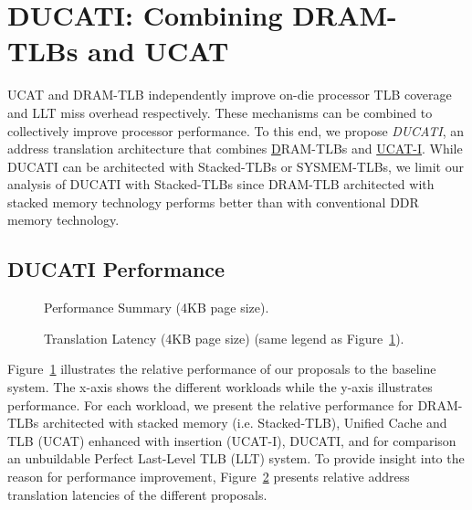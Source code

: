 \section{DUCATI: Combining DRAM-TLBs \newline and UCAT}
\label{sec:DUCATI}

\noindent UCAT and DRAM-TLB independently improve on-die
processor TLB coverage and LLT miss overhead respectively. These
mechanisms can be combined to collectively improve processor
performance. To this end, we propose {\em DUCATI}, an address
translation architecture that combines \underline{D}RAM-TLBs and
\underline{UCAT-I}. While DUCATI can be architected with Stacked-TLBs
or SYSMEM-TLBs, we limit our analysis of DUCATI with Stacked-TLBs
since DRAM-TLB architected with stacked memory technology performs
better than with conventional DDR memory technology.

\subsection{DUCATI Performance}

\begin{figure}[tp] 
\vspace{-0 in} \centering
\centerline{}

\caption{\small Performance Summary (4KB page size).\normalsize}
\label{fig:summary_4k_pages_perf} 
\vspace{0.1 in}
\end{figure}

\begin{figure}[tp] 
\vspace{0.1 in} \centering
\centerline{}

\caption{\small Translation Latency (4KB page size) (same legend as
  Figure~\ref{fig:summary_4k_pages_perf}).\normalsize}
\label{fig:summary_4k_pages_lat} 
\vspace{-0. in}
\end{figure}

\noindent Figure~\ref{fig:summary_4k_pages_perf} illustrates the
relative performance of our proposals to the baseline system. The
x-axis shows the different workloads while the y-axis illustrates
performance. For each workload, we present the relative performance
for DRAM-TLBs architected with stacked memory (i.e. Stacked-TLB),
Unified Cache and TLB (UCAT) enhanced with insertion (UCAT-I), DUCATI,
and for comparison an unbuildable Perfect Last-Level TLB (LLT)
system. To provide insight into
the reason for performance improvement,
Figure~\ref{fig:summary_4k_pages_lat} presents relative address
translation latencies of the different proposals.

